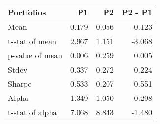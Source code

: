 \begin{tabular}{lrrr}
\toprule
Portfolios & P1 & P2 & P2 - P1 \\
\midrule
Mean & 0.179 & 0.056 & -0.123 \\
t-stat of mean & 2.967 & 1.151 & -3.068 \\
p-value of mean & 0.006 & 0.259 & 0.005 \\
Stdev & 0.337 & 0.272 & 0.224 \\
Sharpe & 0.533 & 0.207 & -0.551 \\
Alpha & 1.349 & 1.050 & -0.298 \\
t-stat of alpha & 7.068 & 8.843 & -1.480 \\
\bottomrule
\end{tabular}
